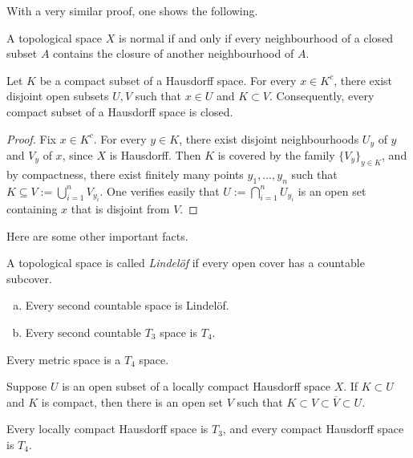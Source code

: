 With a very similar proof, one shows the following.
\begin{proposition}
	A topological space $X$ is normal if and only if every neighbourhood of a closed subset $A$ contains the closure of another neighbourhood of $A$.
\end{proposition}

\begin{proposition}
	Let $K$ be a compact subset of a Hausdorff space. For every $x \in K^c$, there exist disjoint open subsets $U, V$ such that $x \in U$ and $K \subset V$. Consequently, every compact subset of a Hausdorff space is closed.
\end{proposition}

\begin{proof}
	Fix $x \in K^c$. For every $y \in K$, there exist disjoint neighbourhoods $U_y$ of $y$ and $V_y$ of $x$, since $X$ is Hausdorff. Then $K$ is covered by the family $\{V_y\}_{y \in K}$, and by compactness, there exist finitely many points $y_1, \ldots, y_n$ such that $K \subseteq V := \bigcup_{i=1}^n V_{y_i}$. One verifies easily that $U := \bigcap_{i=1}^n U_{y_i}$ is an open set containing $x$ that is disjoint from $V$.
\end{proof}

Here are some other important facts.
\begin{proposition}
	A topological space is called \emph{Lindel\"{o}f} if every open cover has a countable subcover.
	\begin{enumerate}[(a)]
		\item Every second countable space is Lindel\"{o}f.
		\item Every second countable $T_3$ space is $T_4$.
	\end{enumerate}
\end{proposition}

\begin{proposition}
	Every metric space is a $T_4$ space.
\end{proposition}

\begin{theorem}
	Suppose $U$ is an open subset of a locally compact Hausdorff space $X$. If $K \subset U$ and $K$ is compact, then there is an open set $V$ such that $K \subset V \subset \overline{V} \subset U$.
\end{theorem}

\begin{corollary}
	Every locally compact Hausdorff space is $T_3$, and every compact Hausdorff space is $T_4$.
\end{corollary}


